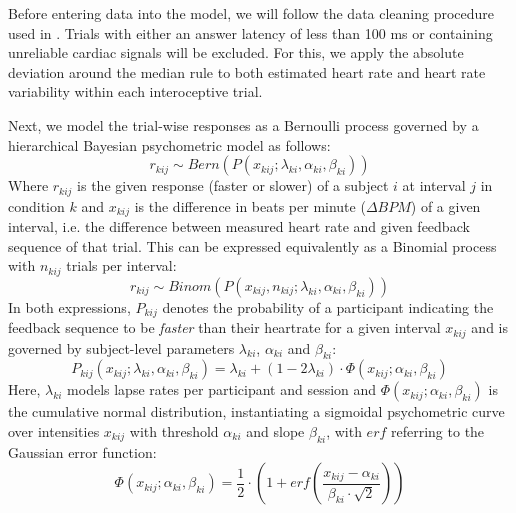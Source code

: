 \documentclass{article}
\begin{document}
Before entering data into the model, we will follow the data cleaning procedure used in \textcite{legrand2022heart}. Trials with either an answer latency of less than 100 ms or containing unreliable cardiac signals will be excluded. For this, we apply the absolute deviation around the median rule \parencite{leys2013detecting} to both estimated heart rate and heart rate variability within each interoceptive trial.

Next, we model the trial-wise responses as a Bernoulli process governed by a hierarchical Bayesian psychometric model as follows:
\[
r_{kij} \sim Bern(P(x_{kij};\lambda_{ki}, \alpha_{ki}, \beta_{ki}))
\]
Where $r_{kij}$ is the given response (faster or slower) of a subject $i$ at interval $j$ in condition $k$ and $x_{kij}$ is the difference in beats per minute ($\Delta BPM$) of a given interval, i.e. the difference between measured heart rate and given feedback sequence of that trial. This can be expressed equivalently as a Binomial process with $n_{kij}$ trials per interval:
\[
r_{kij} \sim Binom(P(x_{kij}, n_{kij};\lambda_{ki}, \alpha_{ki}, \beta_{ki}))
\]
In both expressions, $P_{kij}$ denotes the probability of a participant indicating the feedback sequence to be \emph{faster} than their heartrate for a given interval $x_{kij}$ and is governed by subject-level parameters $\lambda_{ki}$, $\alpha_{ki}$ and $\beta_{ki}$:
\[
P_{kij}(x_{kij};\lambda_{ki}, \alpha_{ki}, \beta_{ki}) = \lambda_{ki} + (1 - 2 \lambda_{ki}) \cdot \Phi(x_{kij};\alpha_{ki}, \beta_{ki})
\]
Here, $\lambda_{ki}$ models lapse rates per participant and session and $\Phi(x_{kij};\alpha_{ki}, \beta_{ki})$ is the cumulative normal distribution, instantiating a sigmoidal psychometric curve over intensities $x_{kij}$ with threshold $\alpha_{ki}$ and slope $\beta_{ki}$, with $erf$ referring to the Gaussian error function:
\[
\Phi(x_{kij};\alpha_{ki}, \beta_{ki}) = 
\frac{1}{2} 
\cdot 
\left(1+erf\left(\frac{x_{kij}-\alpha_{ki}}{\beta_{ki} \cdot \sqrt{2}}\right)\right)
\]
\end{document}
